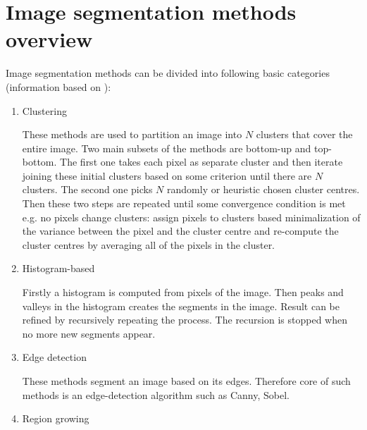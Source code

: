 \section{Image segmentation methods overview}

Image segmentation methods can be divided into following basic categories (information based on \cite{wiki}):

\begin{enumerate}

  \item Clustering

  These methods are used to partition an image into $N$ clusters that cover the entire image.
Two main subsets of the methods are bottom-up and top-bottom.
The first one takes each pixel as separate cluster and then iterate joining these initial clusters based on some criterion until there are $N$ clusters.
The second one picks $N$ randomly or heuristic chosen cluster centres.
Then these two steps are repeated until some convergence condition is met e.g. no pixels change clusters: assign pixels to clusters based minimalization of the variance between the pixel and the cluster centre and re-compute the cluster centres by averaging all of the pixels in the cluster.

  \item Histogram-based

  Firstly a histogram is computed from pixels of the image.
Then peaks and valleys in the histogram creates the segments in the image.
Result can be refined by recursively repeating the process.
The recursion is stopped when no more new segments appear.

  \item Edge detection

  These methods segment an image based on its edges.
Therefore core of such methods is an edge-detection algorithm such as Canny, Sobel.

  \item Region growing


\end{enumerate}
